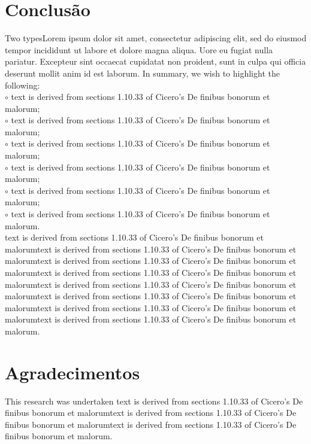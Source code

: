 \documentclass[a0,portrait]{a0poster}
\begin{document}
\begin{minipage}[c]{\linewidth}
\begin{framed}
\begin{multicols}{2}
\section*{Conclusão}
Two typesLorem ipsum dolor sit amet, consectetur adipiscing elit, sed do eiusmod tempor incididunt ut labore et dolore magna aliqua. Uore eu fugiat nulla pariatur. Excepteur sint occaecat cupidatat non proident, sunt in culpa qui officia deserunt mollit anim id est laborum. In summary, we wish to highlight the following:\\ 
\hspace{0.1cm}$\circ$ text is derived from sections 1.10.33 of Cicero's De finibus bonorum et malorum;\\
\hspace{0.1cm}$\circ$ text is derived from sections 1.10.33 of Cicero's De finibus bonorum et malorum;\\
\hspace{0.1cm}$\circ$ text is derived from sections 1.10.33 of Cicero's De finibus bonorum et malorum;\\ 
\hspace{0.1cm}$\circ$ text is derived from sections 1.10.33 of Cicero's De finibus bonorum et malorum;\\
\hspace{0.1cm}$\circ$ text is derived from sections 1.10.33 of Cicero's De finibus bonorum et malorum;\\
\hspace{0.1cm}$\circ$ text is derived from sections 1.10.33 of Cicero's De finibus bonorum et malorum.\\
text is derived from sections 1.10.33 of Cicero's De finibus bonorum et malorumtext is derived from sections 1.10.33 of Cicero's De finibus bonorum et malorumtext is derived from sections 1.10.33 of Cicero's De finibus bonorum et malorumtext is derived from sections 1.10.33 of Cicero's De finibus bonorum et malorumtext is derived from sections 1.10.33 of Cicero's De finibus bonorum et malorumtext is derived from sections 1.10.33 of Cicero's De finibus bonorum et malorumtext is derived from sections 1.10.33 of Cicero's De finibus bonorum et malorumtext is derived from sections 1.10.33 of Cicero's De finibus bonorum et malorum.
\section*{Agradecimentos}
This research was undertaken text is derived from sections 1.10.33 of Cicero's De finibus bonorum et malorumtext is derived from sections 1.10.33 of Cicero's De finibus bonorum et malorumtext is derived from sections 1.10.33 of Cicero's De finibus bonorum et malorum.
\end{multicols}
\vspace{0.5cm}
\end{framed}
\end{minipage}
\end{document}
